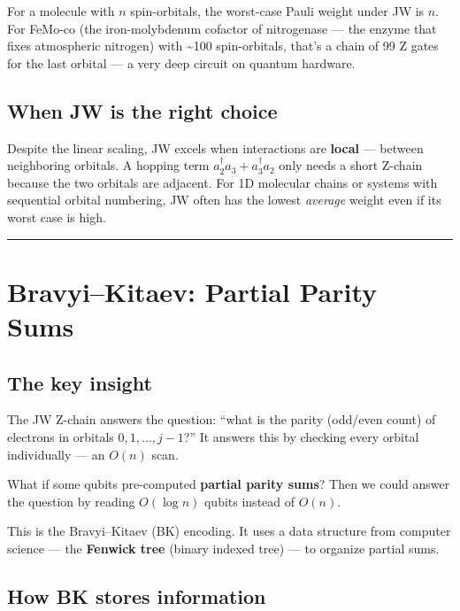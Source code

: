 \documentclass[
  11pt,
  oneside]{book}
\begin{document}
For a molecule with \(n\) spin-orbitals, the worst-case Pauli weight
under JW is \(n\). For FeMo-co (the iron-molybdenum cofactor of
nitrogenase --- the enzyme that fixes atmospheric nitrogen) with
\textasciitilde100 spin-orbitals, that's a chain of 99 Z gates for the
last orbital --- a very deep circuit on quantum hardware.

\subsection{When JW is the right
choice}\label{when-jw-is-the-right-choice}

Despite the linear scaling, JW excels when interactions are
\textbf{local} --- between neighboring orbitals. A hopping term
\(a_2^\dagger a_3 + a_3^\dagger a_2\) only needs a short Z-chain because
the two orbitals are adjacent. For 1D molecular chains or systems with
sequential orbital numbering, JW often has the lowest \emph{average}
weight even if its worst case is high.

\begin{center}\rule{0.5\linewidth}{0.5pt}\end{center}

\section{Bravyi--Kitaev: Partial Parity
Sums}\label{bravyikitaev-partial-parity-sums}

\subsection{The key insight}\label{the-key-insight}

The JW Z-chain answers the question: ``what is the parity (odd/even
count) of electrons in orbitals \(0, 1, \ldots, j-1\)?'' It answers this
by checking every orbital individually --- an \(O(n)\) scan.

What if some qubits pre-computed \textbf{partial parity sums}? Then we
could answer the question by reading \(O(\log n)\) qubits instead of
\(O(n)\).

This is the Bravyi--Kitaev (BK) encoding. It uses a data structure from
computer science --- the \textbf{Fenwick tree} (binary indexed tree) ---
to organize partial sums.

\subsection{How BK stores information}\label{how-bk-stores-information}
\end{document}
